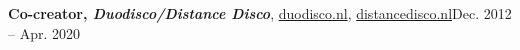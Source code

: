 \resumeProjectHeading
    {\textbf{Co-creator, \emph{Duodisco/Distance Disco}}, \href{https://duodisco.nl}{duodisco.nl}, \href{https://distancedisco.nl}{distancedisco.nl}}{Dec. 2012 -- Apr. 2020}
    \resumeItemListStart
    \resumeItemListEnd